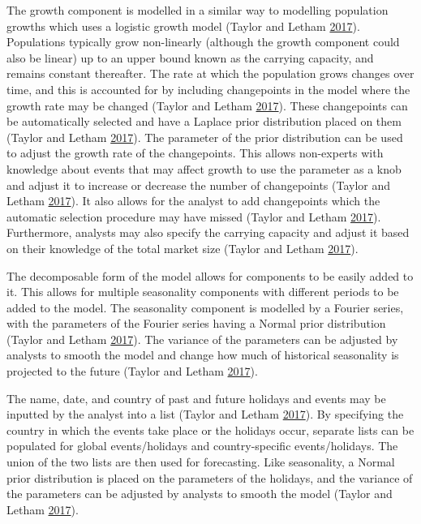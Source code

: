 \documentclass[12pt,preprint, authoryear]{elsarticle}
\numberwithin{equation}{section}
\numberwithin{figure}{section}
\numberwithin{table}{section}
\begin{document}
The growth component is modelled in a similar way to modelling
population growths which uses a logistic growth model (Taylor and Letham
\protect\hyperlink{ref-taylor2017forecasting}{2017}). Populations
typically grow non-linearly (although the growth component could also be
linear) up to an upper bound known as the carrying capacity, and remains
constant thereafter. The rate at which the population grows changes over
time, and this is accounted for by including changepoints in the model
where the growth rate may be changed (Taylor and Letham
\protect\hyperlink{ref-taylor2017forecasting}{2017}). These changepoints
can be automatically selected and have a Laplace prior distribution
placed on them (Taylor and Letham
\protect\hyperlink{ref-taylor2017forecasting}{2017}). The parameter of
the prior distribution can be used to adjust the growth rate of the
changepoints. This allows non-experts with knowledge about events that
may affect growth to use the parameter as a knob and adjust it to
increase or decrease the number of changepoints (Taylor and Letham
\protect\hyperlink{ref-taylor2017forecasting}{2017}). It also allows for
the analyst to add changepoints which the automatic selection procedure
may have missed (Taylor and Letham
\protect\hyperlink{ref-taylor2017forecasting}{2017}). Furthermore,
analysts may also specify the carrying capacity and adjust it based on
their knowledge of the total market size (Taylor and Letham
\protect\hyperlink{ref-taylor2017forecasting}{2017}).

The decomposable form of the model allows for components to be easily
added to it. This allows for multiple seasonality components with
different periods to be added to the model. The seasonality component is
modelled by a Fourier series, with the parameters of the Fourier series
having a Normal prior distribution (Taylor and Letham
\protect\hyperlink{ref-taylor2017forecasting}{2017}). The variance of
the parameters can be adjusted by analysts to smooth the model and
change how much of historical seasonality is projected to the future
(Taylor and Letham \protect\hyperlink{ref-taylor2017forecasting}{2017}).

The name, date, and country of past and future holidays and events may
be inputted by the analyst into a list (Taylor and Letham
\protect\hyperlink{ref-taylor2017forecasting}{2017}). By specifying the
country in which the events take place or the holidays occur, separate
lists can be populated for global events/holidays and country-specific
events/holidays. The union of the two lists are then used for
forecasting. Like seasonality, a Normal prior distribution is placed on
the parameters of the holidays, and the variance of the parameters can
be adjusted by analysts to smooth the model (Taylor and Letham
\protect\hyperlink{ref-taylor2017forecasting}{2017}).
\end{document}
